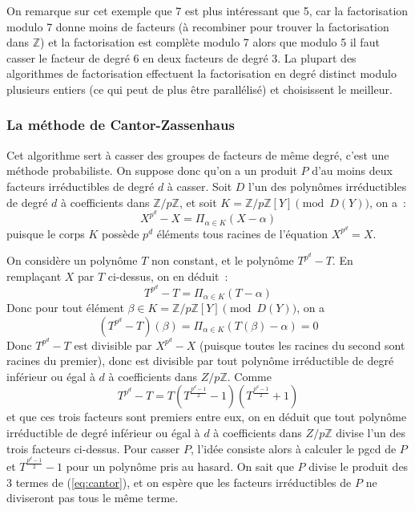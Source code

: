 \documentclass[a4paper,11pt]{article}
\newcommand{\Z}{{\mathbb{Z}}}
\begin{document}
\begin{giacjshere}
On remarque sur cet exemple que 7 est plus intéressant que 5, car
la factorisation modulo 7 donne moins de facteurs (à recombiner pour
trouver la factorisation dans $\Z$) et la factorisation est
complète modulo 7 alors que modulo 5 il faut casser le facteur de
degré 6 en deux facteurs de degré 3. La plupart des algorithmes
de factorisation effectuent la factorisation en degré distinct
modulo plusieurs entiers (ce qui peut de plus être parallélisé)
et choisissent le meilleur.

\subsubsection{La méthode de Cantor-Zassenhaus}
Cet algorithme sert à casser des groupes de facteurs de même degré,
c'est une méthode probabiliste. On suppose donc qu'on a un produit $P$
d'au moins deux facteurs irréductibles de degré $d$ à casser.
Soit $D$ l'un des polynômes irréductibles de degré $d$ à coefficients
dans $\Z/p\Z$, et soit $K=\Z/p\Z[Y] \pmod {D(Y)}$, on a~:
\[X^{p^d}-X=\Pi_{\alpha \in K }(X-\alpha) \]
puisque le corps $K$ possède $p^d$ éléments tous racines
de l'équation $X^{p^d}=X$.

On considère un polynôme $T$ non constant, et le polynôme
$T^{p^d}-T$. En remplaçant $X$ par $T$ ci-dessus, on en déduit~:
\[T^{p^d}-T=\Pi_{\alpha \in K }(T-\alpha) \]
Donc pour tout élément $\beta \in K=\Z/p\Z[Y] \pmod {D(Y)}$, on a
\[(T^{p^d}-T)(\beta)=\Pi_{\alpha \in K }(T(\beta)-\alpha)=0\]
Donc $T^{p^d}-T$ est divisible par $X^{p^d}-X$ (puisque toutes les racines
du second sont racines du premier), donc est divisible par tout polynôme
irréductible de degré inférieur ou égal à $d$ à coefficients dans $Z/p\Z$.
Comme
\begin{equation} \label{eq:cantor}
T^{p^d}-T=T(T^{\frac{p^d-1}{2}}-1)(T^{\frac{p^d-1}{2}}+1)
\end{equation}
et que ces trois facteurs sont premiers entre eux, on en déduit que tout 
polynôme irréductible de degré inférieur ou égal à $d$ à coefficients dans 
$Z/p\Z$ divise l'un des trois facteurs ci-dessus. Pour casser $P$, l'idée
consiste alors à calculer le pgcd de $P$ et $T^{\frac{p^d-1}{2}}-1$
pour un polynôme pris au hasard. On sait que $P$ divise le produit des
3 termes de (\ref{eq:cantor}), et on espère que les facteurs irréductibles
de $P$ ne diviseront pas tous le même terme.


\end{giacjshere}
\end{document}
